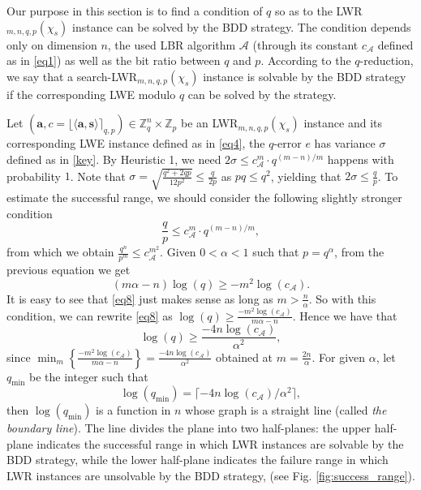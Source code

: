 \documentclass[runningheads]{llncs}
\begin{document}
Our purpose in this section is to find a condition of $q$ so as to the LWR$_{m,n,q,p}(\chi_s)$ instance can be solved by the BDD strategy. The condition depends only on dimension $n$, the used LBR algorithm $\mathcal{A}$ (through its constant $c_{\mathcal{A}}$ defined as in \eqref{eq1}) as well as the bit ratio between $q$ and $p$. According to the $q$-reduction, we say that a search-LWR$_{m,n,q,p}(\chi_s)$ instance is solvable by the BDD strategy if the corresponding LWE modulo $q$ can be solved by the strategy.

Let $(\mathbf{a},c=\lfloor\langle \mathbf{a},\mathbf{s} \rangle \rceil_{q,p})\in \mathbb{Z}_q^n \times \mathbb{Z}_p$ be an LWR$_{m,n,q,p}(\chi_s)$ instance and its corresponding LWE instance defined as in \eqref{eq4}, the $q$-error $e$ has variance $\sigma$ defined as in \eqref{key}.
By Heuristic 1, we need
$2\sigma \leq c_{\mathcal{A}}^{m}\cdot q^{(m-n)/m}$
happens with probability $1$.
Note that $\sigma=\sqrt{\frac{q^2+2qp}{12p^2}} \leq \frac{q}{2p}$ as $pq \leq q^2$, yielding that $2\sigma \leq \frac{q}{p}$. 
To estimate the successful range, we should consider the following slightly stronger condition
\begin{equation*}
\frac{q}{p} \leq c_{\mathcal{A}}^{m}\cdot q^{(m-n)/m},
\end{equation*}
from which we obtain
$\frac{q^n}{p^m} \leq c_{\mathcal{A}}^{m^2}. $
Given $0<\alpha<1$ such that $p=q^{\alpha}$, from the previous equation we get 
\begin{equation}\label{eq8}
(m \alpha-n)\log (q) \geq -m^2 \log (c_{\mathcal{A}}).
\end{equation}
It is easy to see that \eqref{eq8} just makes sense as long as $m>\frac{n}{\alpha}$. So with this condition, we can rewrite \eqref{eq8} as
$\log (q) \geq \frac{-m^2 \log (c_{\mathcal{A}})}{m \alpha-n}.$
Hence we have that
\begin{equation*}
\log (q) \geq \frac{-4n  \log (c_{\mathcal{A}})}{\alpha^2},
\end{equation*}
since $ \min_{m} \left\{\frac{-m^2 \log (c_{\mathcal{A}})}{m \alpha-n}\right\}=\frac{-4n \log (c_{\mathcal{A}})}{\alpha^2}$ obtained at $m=\frac{2n}{\alpha}$. For given $\alpha$, let $q_{\text{min}}$ be the integer such that 
\begin{equation}\label{eq11}
\log (q_{\text{min}})=\lceil -4n  \log (c_{\mathcal{A}})/\alpha^2 \rceil,
\end{equation}
then $\log (q_{\text{min}})$ is a function in $n$ whose graph is a straight line (called \textit{the boundary line}). The line divides the plane into two half-planes: the upper half-plane indicates the successful range in which LWR instances are solvable by the BDD strategy, while the lower half-plane indicates the failure range in which LWR instances are unsolvable by the BDD strategy, (see Fig. \ref{fig:success_range}).
\end{document}
